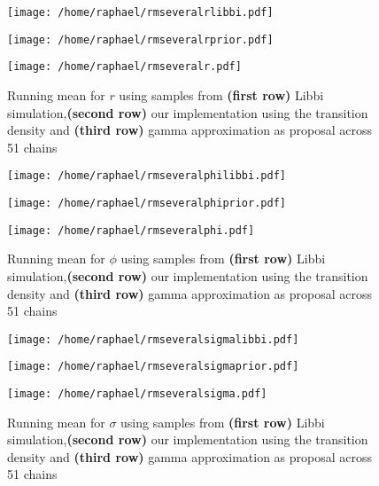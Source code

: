 \documentclass{article}
\begin{document}
	\begin{figure}[htb]
		\centering
		\begin{minipage}{0.6\textwidth}
			\centering
			\texttt{[image: /home/raphael/rmseveralrlibbi.pdf]}
		\end{minipage}
		\begin{minipage}{0.6\textwidth}
			\centering
			\texttt{[image: /home/raphael/rmseveralrprior.pdf]}
		\end{minipage}
		\begin{minipage}{0.6\textwidth}
			\centering
			\texttt{[image: /home/raphael/rmseveralr.pdf]}
		\end{minipage}
		\caption{Running mean for $r$ using samples from \textbf{(first row)} Libbi simulation,\textbf{(second row)} our implementation using the transition density and \textbf{(third row)} gamma approximation as proposal across 51 chains}
		\label{fig:rmr}
	\end{figure}
	
	
		\begin{figure}[htb]
			\centering
			\begin{minipage}{0.6\textwidth}
				\centering
				\texttt{[image: /home/raphael/rmseveralphilibbi.pdf]}
			\end{minipage}
			\begin{minipage}{0.6\textwidth}
				\centering
				\texttt{[image: /home/raphael/rmseveralphiprior.pdf]}
			\end{minipage}
			\begin{minipage}{0.6\textwidth}
				\centering
				\texttt{[image: /home/raphael/rmseveralphi.pdf]}
			\end{minipage}
			\caption{Running mean for $\phi$ using samples from \textbf{(first row)} Libbi simulation,\textbf{(second row)} our implementation using the transition density and \textbf{(third row)} gamma approximation as proposal across 51 chains}
			\label{fig:rmphi}
		\end{figure}
		
		\begin{figure}[htb]
			\centering
			\begin{minipage}{0.6\textwidth}
				\centering
				\texttt{[image: /home/raphael/rmseveralsigmalibbi.pdf]}
			\end{minipage}
			\begin{minipage}{0.6\textwidth}
				\centering
				\texttt{[image: /home/raphael/rmseveralsigmaprior.pdf]}
			\end{minipage}
			\begin{minipage}{0.6\textwidth}
				\centering
				\texttt{[image: /home/raphael/rmseveralsigma.pdf]}
			\end{minipage}
			\caption{Running mean for $\sigma$ using samples from \textbf{(first row)} Libbi simulation,\textbf{(second row)} our implementation using the transition density and \textbf{(third row)} gamma approximation as proposal across 51 chains}
			\label{fig:rmsigma}
		\end{figure}
		
\end{document}

